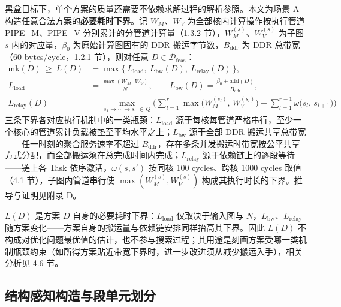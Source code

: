 黑盒目标下，单个方案的质量还需要不依赖求解过程的解析参照。本文为场景 A 构造任意合法方案的\textbf{必要耗时下界}。记 $W_M$、$W_V$ 为全部核内计算操作按执行管道 PIPE\_M、PIPE\_V 分别累计的分管道计算量（1.3.2 节），$W_M^{(s)}$、$W_V^{(s)}$ 为子图 $s$ 内的对应量，$\beta_0$ 为原始计算图固有的 DDR 搬运字节数，$B_{\mathrm{ddr}}$ 为 DDR 总带宽（60 bytes/cycle，1.2.1 节），则对任意 $D\in\mathcal{D}_{\mathrm{feas}}$：
\begin{equation}\label{eq:q1-lb}
\begin{aligned}
\mathrm{mk}(D)\ \ge\ L(D)&=\max\{\,L_{\mathrm{load}},\ L_{\mathrm{bw}}(D),\ L_{\mathrm{relay}}(D)\,\},\\
L_{\mathrm{load}}&=\frac{\max(W_M,\,W_V)}{N},\qquad
L_{\mathrm{bw}}(D)=\frac{\beta_0+\mathrm{add}(D)}{B_{\mathrm{ddr}}},\\
L_{\mathrm{relay}}(D)&=\max_{s_1\rightarrow\cdots\rightarrow s_r\,\in\,Q}\Bigg(\sum_{l=1}^{r}\max\big(W_M^{(s_l)},\,W_V^{(s_l)}\big)+\sum_{l=1}^{r-1}\omega\big(s_l,\,s_{l+1}\big)\Bigg)
\end{aligned}
\end{equation}
三条下界各对应执行机制中的一类瓶颈：$L_{\mathrm{load}}$ 源于每核每管道严格串行，至少一个核心的管道累计负载被垫至平均水平之上；$L_{\mathrm{bw}}$ 源于全部 DDR 搬运共享总带宽——任一时刻的聚合服务速率不超过 $B_{\mathrm{ddr}}$，存在多条并发搬运时带宽按公平共享方式分配，而全部搬运须在总完成时间内完成；$L_{\mathrm{relay}}$ 源于依赖链上的逐段等待——链上各 Task 依序激活，$\omega(s,s')$ 按同核 100 cycles、跨核 1000 cycles 取值（4.1 节），子图内管道串行使 $\max(W_M^{(s)},W_V^{(s)})$ 构成其执行时长的下界。推导与证明见附录 D。

$L(D)$ 是方案 $D$ 自身的必要耗时下界：$L_{\mathrm{load}}$ 仅取决于输入图与 $N$，$L_{\mathrm{bw}}$、$L_{\mathrm{relay}}$ 随方案变化——方案自身的搬运量与依赖链安排同样抬高其下界。因此 $L(D)$ 不构成对优化问题最优值的估计，也不参与搜索过程；其用途是刻画方案受哪一类机制瓶颈约束（如所得方案贴近带宽下界时，进一步改进须从减少搬运入手），相关分析见 4.6 节。

\subsection{结构感知构造与段单元划分}

